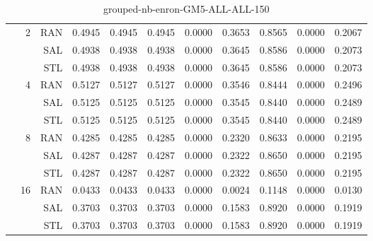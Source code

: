 \begin{center}
\begin{table}[htbp]
\begin{center}
\begin{tabular}{ | r | r | r | r | r | r | r | r | r | r | r |}
 & \multirow{3}{*}{2} & RAN & 0.4945 & 0.4945 & 0.4945 & 0.0000 & 0.3653 & 0.8565 & 0.0000 & 0.2067\\ \cline{3-11}
 &   & SAL & 0.4938 & 0.4938 & 0.4938 & 0.0000 & 0.3645 & 0.8586 & 0.0000 & 0.2073\\ \cline{3-11}
 &   & STL & 0.4938 & 0.4938 & 0.4938 & 0.0000 & 0.3645 & 0.8586 & 0.0000 & 0.2073\\ \cline{2-11}
 & \multirow{3}{*}{4} & RAN & 0.5127 & 0.5127 & 0.5127 & 0.0000 & 0.3546 & 0.8444 & 0.0000 & 0.2496\\ \cline{3-11}
 &   & SAL & 0.5125 & 0.5125 & 0.5125 & 0.0000 & 0.3545 & 0.8440 & 0.0000 & 0.2489\\ \cline{3-11}
 &   & STL & 0.5125 & 0.5125 & 0.5125 & 0.0000 & 0.3545 & 0.8440 & 0.0000 & 0.2489\\ \cline{2-11}
 & \multirow{3}{*}{8} & RAN & 0.4285 & 0.4285 & 0.4285 & 0.0000 & 0.2320 & 0.8633 & 0.0000 & 0.2195\\ \cline{3-11}
 &   & SAL & 0.4287 & 0.4287 & 0.4287 & 0.0000 & 0.2322 & 0.8650 & 0.0000 & 0.2195\\ \cline{3-11}
 &   & STL & 0.4287 & 0.4287 & 0.4287 & 0.0000 & 0.2322 & 0.8650 & 0.0000 & 0.2195\\ \cline{2-11}
 & \multirow{3}{*}{16} & RAN & 0.0433 & 0.0433 & 0.0433 & 0.0000 & 0.0024 & 0.1148 & 0.0000 & 0.0130\\ \cline{3-11}
 &   & SAL & 0.3703 & 0.3703 & 0.3703 & 0.0000 & 0.1583 & 0.8920 & 0.0000 & 0.1919\\ \cline{3-11}
 &   & STL & 0.3703 & 0.3703 & 0.3703 & 0.0000 & 0.1583 & 0.8920 & 0.0000 & 0.1919\\ \cline{2-11}
\hline
\end{tabular}
\caption{grouped-nb-enron-GM5-ALL-ALL-150}
\end{center}
 \end{table}
\end{center}

